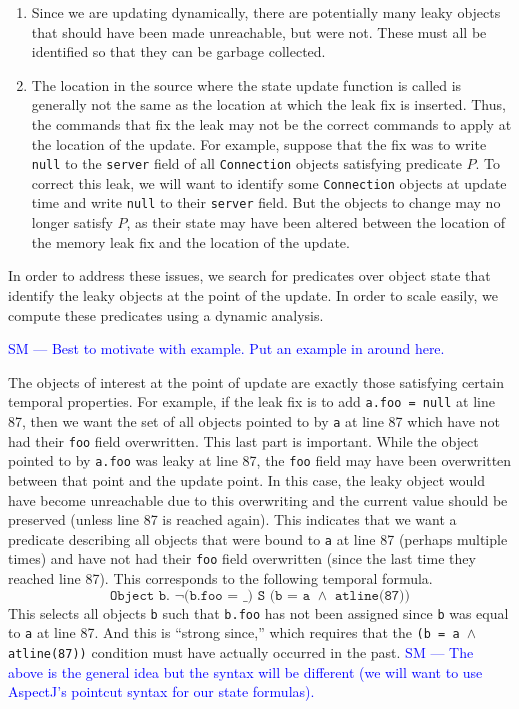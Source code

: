 \documentclass[natbib,preprint]{sigplanconf}
\newcommand{\stephencomment}[1]{\textcolor{blue}{SM --- #1}}
\begin{document}
\begin{enumerate}
\item
\label{enum:identify}
Since we are updating dynamically, there are potentially many leaky
objects that should have been made unreachable, but were not.  These
must all be identified so that they can be garbage collected.
\item 
\label{enum:different-loc}
The location in the source where the state update function is called
is generally not the same as the location at which the leak fix is
inserted.  Thus, the commands that fix the leak may not be the correct
commands to apply at the location of the update.  For example, suppose
that the fix was to write \texttt{null} to the \texttt{server} field
of all \texttt{Connection} objects satisfying predicate $P$.  To
correct this leak, we will want to identify some \texttt{Connection}
objects at update time and write \texttt{null} to their
\texttt{server} field.  But the objects to change may no longer
satisfy $P$, as their state may have been altered between the location
of the memory leak fix and the location of the update.
\end{enumerate}

In order to address these issues, we search for predicates over object
state that identify the leaky objects at the point of the update.  In
order to scale easily, we compute these predicates using a dynamic
analysis.

\stephencomment{Best to motivate with example.  Put an example in around here.}

The objects of interest at the point of update are exactly those satisfying certain temporal properties.  For example, if the leak fix is to add \texttt{a.foo = null} at line 87, then we want the set of all objects pointed to by \texttt{a} at line 87 which have not had their \texttt{foo} field overwritten.  This last part is important.  While the object pointed to by \texttt{a.foo} was leaky at line 87, the \texttt{foo} field may have been overwritten between that point and the update point.  In this case, the leaky object would have become unreachable due to this overwriting and the current value should be preserved (unless line 87 is reached again).  This indicates that we want a predicate describing all objects that were bound to \texttt{a} at line 87 (perhaps multiple times) and have not had their \texttt{foo} field overwritten (since the last time they reached line 87).  This corresponds to the following temporal formula.
\[\texttt{Object b. $\neg$(b.foo = \_) S (b = a $\wedge$ atline(87))}\]
This selects all objects \texttt{b} such that \texttt{b.foo} has not been assigned since \texttt{b} was equal to \texttt{a} at line 87.  And this is ``strong since,'' which requires that the \texttt{(b = a $\wedge$ atline(87))} condition must have actually occurred in the past.
\stephencomment{The above is the general idea but the syntax will be different (we will want to use AspectJ's pointcut syntax for our state formulas).}
\end{document}
